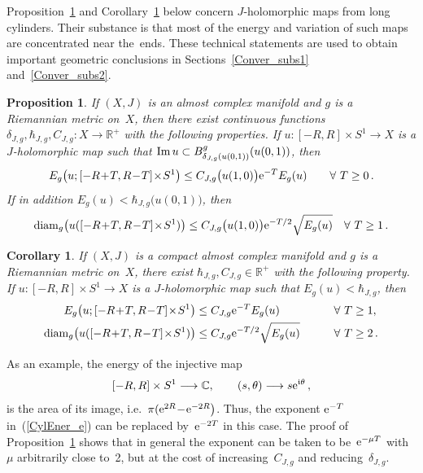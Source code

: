 \documentclass[11pt]{article}
\numberwithin{equation}{section}
\newtheorem{prp}[thm]{Proposition}
\newtheorem{crl}[thm]{Corollary}
\theoremstyle{definition}
\def\BE#1{\begin{equation}\label{#1}}
\def\EE{\end{equation}}
\def\eref#1{(\ref{#1})}
\def\lra{\longrightarrow}
\def\C{\mathbb{C}}
\def\fI{\mathfrak i}
\def\R{\mathbb R}
\def\de{\delta}
\def\th{\theta}
\def\hb{\hbar}
\def\diam{\textnormal{diam}}
\def\Im{\textnormal{Im}}
\def\ne{\textnormal{e}}
\begin{document}
\noindent
Proposition~\ref{CylEner_prp} and Corollary~\ref{CylEner_crl} below 
concern $J$-holomorphic maps from long cylinders.
Their substance is that most of the energy and variation of such maps
are concentrated near the~ends.
These technical statements are used to obtain important geometric conclusions
in Sections~\ref{Conver_subs1} and~\ref{Conver_subs2}.

\begin{prp}\label{CylEner_prp}
If $(X,J)$ is an almost complex manifold and $g$ is a Riemannian metric on~$X$, then 
there exist continuous functions $\de_{J,g},\hb_{J,g},C_{J,g}\!:X\!\lra\!\R^+$
with the following properties.
If \hbox{$u\!:[-R,R]\!\times\!S^1\!\lra\!X$} is a \hbox{$J$-holomorphic} map such that
$\Im\,u\subset B_{\de_{J,g}(u(0,1))}^g(u(0,1))$, then 
\BE{CylEner_e}
E_g\big(u;[-R\!+\!T,R\!-\!T]\!\times\!S^1\big) \le 
C_{J,g}\big(u(1,0)\big)\ne^{-T}E_g(u) \qquad\forall~T\ge0\,.\EE
If in addition $E_g(u)<\hb_{J,g}\big(u(0,1)\big)$, then
\BE{CylEner_e2}
\diam_g\big(u([-R\!+\!T,R\!-\!T]\!\times\!S^1)\big)
\le C_{J,g}\big(u(1,0)\big) \ne^{-T/2}\sqrt{E_g(u)} \quad\forall~T\ge1\,.\EE
\end{prp}


\begin{crl}\label{CylEner_crl}
If $(X,J)$ is a compact almost complex manifold and $g$ is a Riemannian metric on~$X$, 
there exist $\hb_{J,g},C_{J,g}\!\in\!\R^+$ with the following property.
If $u\!:[-R,R]\!\times\!S^1\!\lra\!X$ is a \hbox{$J$-holomorphic} map such that 
$E_g(u)\!<\!\hb_{J,g}$, then 
\begin{alignat*}{2}
E_g\big(u;[-R\!+\!T,R\!-\!T]\!\times\!S^1\big) &\le C_{J,g}\ne^{-T}E_g(u)
&\qquad&\forall~T\ge1,\\
\diam_g\big(u([-R\!+\!T,R\!-\!T]\!\times\!S^1)\big)
&\le C_{J,g}\ne^{-T/2}\sqrt{E_g(u)} &\quad&\forall~T\ge2\,.
\end{alignat*}
\end{crl}

\vspace{.1in}


\noindent
As an example, the energy of the injective map
$$[-R,R]\times S^1\lra \C, \qquad (s,\th)\lra s\ne^{\fI\th}\,,$$
is the area of its image, i.e.~$\pi(\ne^{2R}\!-\!\ne^{-2R}\big)$.
Thus, the exponent $\ne^{-T}$ in~\eref{CylEner_e} can be replaced by~$\ne^{-2T}$ 
in this case.
The proof of Proposition~\ref{CylEner_prp} shows that in general the exponent
can be taken to be~$\ne^{-\mu T}$ with $\mu$ arbitrarily close to~2, 
but at the cost of increasing~$C_{J,g}$ and reducing~$\de_{J,g}$.
\end{document}
